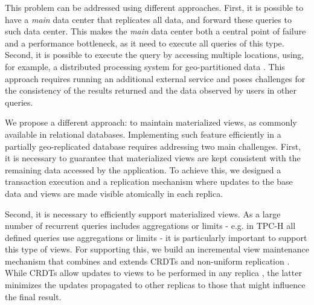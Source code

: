 \documentclass[sigconf, nonacm]{acmart}
\begin{document}
This problem can be addressed using different approaches. 
First, it is possible to have a \emph{main} data center that replicates all data, and forward these queries to such data center.
This makes the \emph{main} data center both a central point of failure and a performance bottleneck, as it need to execute all queries of this type. 
Second, it is possible to execute the query by accessing multiple locations,  using, for example, 
a distributed processing system for geo-partitioned data \cite{kloudas2015pixida,jetstream}.
This approach requires running an additional external service and poses challenges for the consistency of the results returned and the data observed by users in other queries.

We propose a different approach: to maintain materialized views, as commonly available in relational databases.
Implementing such feature efficiently in a partially geo-replicated database requires 
addressing two main challenges. 
First, it is necessary to guarantee that materialized views are kept consistent with the remaining data
accessed by the application. 
To achieve this, we designed a transaction execution and a replication mechanism where updates 
to the base data and views are made visible atomically in each replica.

Second, it is necessary to efficiently support materialized views. 
As a large number of recurrent queries includes aggregations or limits - e.g. in TPC-H \cite{tpch}
all defined queries use aggregations or limits - it is particularly important to support
this type of views.  For supporting this, we build an incremental view maintenance 
mechanism that combines and extends CRDTs \cite{crdt} and non-uniform replication \cite{Cabrita17Nonuniform}.
While CRDTs allow updates to views to be performed in any replica , the latter minimizes
the updates propagated to other replicas to those that might influence the final result.


\end{document}
